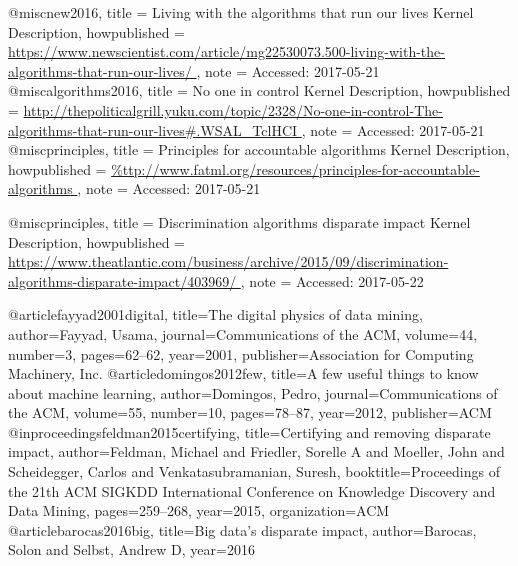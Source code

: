 
@misc{new2016,
  title = {{Living with the algorithms that run our lives} Kernel Description},
  howpublished = {\url{https://www.newscientist.com/article/mg22530073.500-living-with-the-algorithms-that-run-our-lives/
}},
  note = {Accessed: 2017-05-21}
}
@misc{algorithms2016,
  title = {{No one in control} Kernel Description},
  howpublished = {\url{http://thepoliticalgrill.yuku.com/topic/2328/No-one-in-control-The-algorithms-that-run-our-lives#.WSAL_TclHCI
}},
  note = {Accessed: 2017-05-21}
}
@misc{principles,
  title = {{Principles for accountable algorithms} Kernel Description},
  howpublished = {\url{%
}},
  note = {Accessed: 2017-05-21}
}

@misc{principles,
  title = {{Discrimination algorithms disparate impact} Kernel Description},
  howpublished = {\url{https://www.theatlantic.com/business/archive/2015/09/discrimination-algorithms-disparate-impact/403969/
}},
  note = {Accessed: 2017-05-22}
}


@article{fayyad2001digital,
  title={The digital physics of data mining},
  author={Fayyad, Usama},
  journal={Communications of the ACM},
  volume={44},
  number={3},
  pages={62--62},
  year={2001},
  publisher={Association for Computing Machinery, Inc.}
}
@article{domingos2012few,
  title={A few useful things to know about machine learning},
  author={Domingos, Pedro},
  journal={Communications of the ACM},
  volume={55},
  number={10},
  pages={78--87},
  year={2012},
  publisher={ACM}
}
@inproceedings{feldman2015certifying,
  title={Certifying and removing disparate impact},
  author={Feldman, Michael and Friedler, Sorelle A and Moeller, John and Scheidegger, Carlos and Venkatasubramanian, Suresh},
  booktitle={Proceedings of the 21th ACM SIGKDD International Conference on Knowledge Discovery and Data Mining},
  pages={259--268},
  year={2015},
  organization={ACM}
}
@article{barocas2016big,
  title={Big data's disparate impact},
  author={Barocas, Solon and Selbst, Andrew D},
  year={2016}
}





